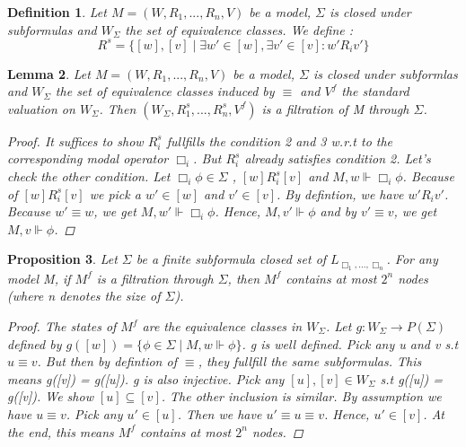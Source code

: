 \documentclass[12pt, a4paper]{scrartcl}
\newtheorem{definition}{Definition}[subsection]
\newtheorem{lemma}[definition]{Lemma}
\newtheorem{proposition}[definition]{Proposition}
\begin{document}
\begin{definition}
    Let $M = (W,R_1,...,R_n,V)$ be a model, $\Sigma$ is closed under subformulas and $W_\Sigma$ the set of equivalence classes. We define :
    $$R^s = \{[w],[v] \mid \exists w' \in [w], \exists v' \in [v] : w'R_i v'\}$$ 
\end{definition}

\begin{lemma}
    Let $M = (W,R_1,...,R_n,V)$ be a model, $\Sigma$ is closed under subformlas and $W_\Sigma$ the set of equivalence classes induced by $\equiv$ and $V^f$ the standard valuation on $W_\Sigma$. Then $(W_\Sigma, R_1^s,...,R_n^s,V^f)$ is 
    a filtration of M through $\Sigma$.
    \begin{proof}
    
    It suffices to show $R^s_i$ fullfills the condition 2 and 3 w.r.t to the corresponding modal operator $\Box_i$. But $R^s_i$ already satisfies condition 2.
    Let's check the other condition. Let $\Box_i \phi \in \Sigma$ , $[w]R^s_i[v]$ and $M,w \Vdash \Box_i \phi$. Because of $[w]R^s_i[v]$ we pick a $w' \in [w]$
    and $v' \in [v]$. By defintion, we have $w'R_i v'$. Because $w' \equiv w$, we get $M,w' \Vdash \Box_i \phi$. Hence, $M,v' \Vdash \phi$ and by $v' \equiv v$, we get $M,v \Vdash \phi$.
    
    \end{proof}    
\end{lemma}

\begin{proposition}
    Let $\Sigma$ be a finite subformula closed set of $L_{\Box_1,...,\Box_n}$. For any model M, if $M^f$ is a filtration through $\Sigma$, then $M^f$ contains at most $2^n$ nodes (where n denotes the size of $\Sigma$).

    \begin{proof}
    The states of $M^f$ are the equivalence classes in $W_\Sigma$. Let $g : W_\Sigma \rightarrow P(\Sigma)$ defined by $g([w]) = \{ \phi \in \Sigma \mid M,w \Vdash \phi\}$.
    g is well defined. Pick any u and v s.t $u\equiv v$. But then by defintion of $\equiv$, they fullfill the same subformulas. This means g([v]) = g([u]). \newline
    g is also injective. Pick any $[u],[v] \in W_\Sigma$ s.t g([u]) = g([v]). We show $[u]\subseteq[v]$. The other inclusion is similar.
    By assumption we have $u \equiv v$. Pick any $u' \in [u]$. Then we have $u' \equiv u \equiv v$. Hence, $u' \in [v]$. At the end, this means $M^f$ contains at most $2^n$ nodes.

    \end{proof}     
\end{proposition}
\end{document}
